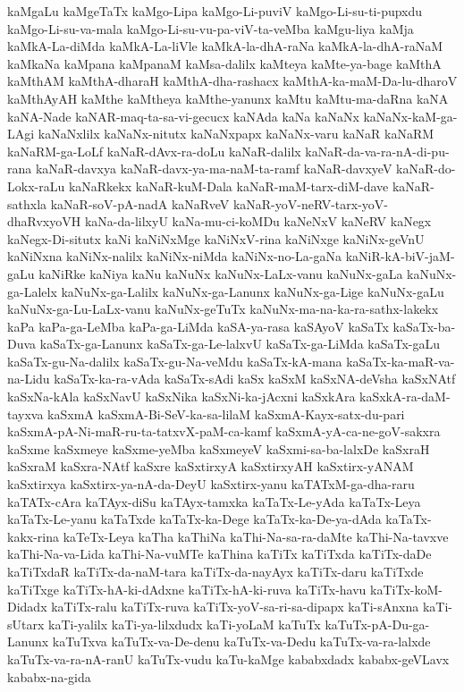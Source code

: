 {kaMgaLu
kaMgeTaTx
kaMgo-Lipa
kaMgo-Li-puviV
kaMgo-Li-su-ti-pupxdu
kaMgo-Li-su-va-mala
kaMgo-Li-su-vu-pa-viV-ta-veMba
kaMgu-liya
kaMja
kaMkA-La-diMda
kaMkA-La-liVle
kaMkA-la-dhA-raNa
kaMkA-la-dhA-raNaM
kaMkaNa
kaMpana
kaMpanaM
kaMsa-dalilx
kaMteya
kaMte-ya-bage
kaMthA
kaMthAM
kaMthA-dharaH
kaMthA-dha-rashacx
kaMthA-ka-maM-Da-lu-dharoV
kaMthAyAH
kaMthe
kaMtheya
kaMthe-yanunx
kaMtu
kaMtu-ma-daRna
kaNA
kaNA-Nade
kaNAR-maq-ta-sa-vi-gecucx
kaNAda
kaNa
kaNaNx
kaNaNx-kaM-ga-LAgi
kaNaNxlilx
kaNaNx-nitutx
kaNaNxpapx
kaNaNx-varu
kaNaR
kaNaRM
kaNaRM-ga-LoLf
kaNaR-dAvx-ra-doLu
kaNaR-dalilx
kaNaR-da-va-ra-nA-di-pu-rana
kaNaR-davxya
kaNaR-davx-ya-ma-naM-ta-ramf
kaNaR-davxyeV
kaNaR-do-Lokx-raLu
kaNaRkekx
kaNaR-kuM-Dala
kaNaR-maM-tarx-diM-dave
kaNaR-sathxla
kaNaR-soV-pA-nadA
kaNaRveV
kaNaR-yoV-neRV-tarx-yoV-dhaRvxyoVH
kaNa-da-lilxyU
kaNa-mu-ci-koMDu
kaNeNxV
kaNeRV
kaNegx
kaNegx-Di-situtx
kaNi
kaNiNxMge
kaNiNxV-rina
kaNiNxge
kaNiNx-geVnU
kaNiNxna
kaNiNx-nalilx
kaNiNx-niMda
kaNiNx-no-La-gaNa
kaNiR-kA-biV-jaM-gaLu
kaNiRke
kaNiya
kaNu
kaNuNx
kaNuNx-LaLx-vanu
kaNuNx-gaLa
kaNuNx-ga-Lalelx
kaNuNx-ga-Lalilx
kaNuNx-ga-Lanunx
kaNuNx-ga-Lige
kaNuNx-gaLu
kaNuNx-ga-Lu-LaLx-vanu
kaNuNx-geTuTx
kaNuNx-ma-na-ka-ra-sathx-lakekx
kaPa
kaPa-ga-LeMba
kaPa-ga-LiMda
kaSA-ya-rasa
kaSAyoV
kaSaTx
kaSaTx-ba-Duva
kaSaTx-ga-Lanunx
kaSaTx-ga-Le-lalxvU
kaSaTx-ga-LiMda
kaSaTx-gaLu
kaSaTx-gu-Na-dalilx
kaSaTx-gu-Na-veMdu
kaSaTx-kA-mana
kaSaTx-ka-maR-va-na-Lidu
kaSaTx-ka-ra-vAda
kaSaTx-sAdi
kaSx
kaSxM
kaSxNA-deVsha
kaSxNAtf
kaSxNa-kAla
kaSxNavU
kaSxNika
kaSxNi-ka-jAcxni
kaSxkAra
kaSxkA-ra-daM-tayxva
kaSxmA
kaSxmA-Bi-SeV-ka-sa-lilaM
kaSxmA-Kayx-satx-du-pari
kaSxmA-pA-Ni-maR-ru-ta-tatxvX-paM-ca-kamf
kaSxmA-yA-ca-ne-goV-sakxra
kaSxme
kaSxmeye
kaSxme-yeMba
kaSxmeyeV
kaSxmi-sa-ba-lalxDe
kaSxraH
kaSxraM
kaSxra-NAtf
kaSxre
kaSxtirxyA
kaSxtirxyAH
kaSxtirx-yANAM
kaSxtirxya
kaSxtirx-ya-nA-da-DeyU
kaSxtirx-yanu
kaTATxM-ga-dha-raru
kaTATx-cAra
kaTAyx-diSu
kaTAyx-tamxka
kaTaTx-Le-yAda
kaTaTx-Leya
kaTaTx-Le-yanu
kaTaTxde
kaTaTx-ka-Dege
kaTaTx-ka-De-ya-dAda
kaTaTx-kakx-rina
kaTeTx-Leya
kaTha
kaThiNa
kaThi-Na-sa-ra-daMte
kaThi-Na-tavxve
kaThi-Na-va-Lida
kaThi-Na-vuMTe
kaThina
kaTiTx
kaTiTxda
kaTiTx-daDe
kaTiTxdaR
kaTiTx-da-naM-tara
kaTiTx-da-nayAyx
kaTiTx-daru
kaTiTxde
kaTiTxge
kaTiTx-hA-ki-dAdxne
kaTiTx-hA-ki-ruva
kaTiTx-havu
kaTiTx-koM-Didadx
kaTiTx-ralu
kaTiTx-ruva
kaTiTx-yoV-sa-ri-sa-dipapx
kaTi-sAnxna
kaTi-sUtarx
kaTi-yalilx
kaTi-ya-lilxdudx
kaTi-yoLaM
kaTuTx
kaTuTx-pA-Du-ga-Lanunx
kaTuTxva
kaTuTx-va-De-denu
kaTuTx-va-Dedu
kaTuTx-va-ra-lalxde
kaTuTx-va-ra-nA-ranU
kaTuTx-vudu
kaTu-kaMge
kababxdadx
kababx-geVLavx
kababx-na-gida
}
